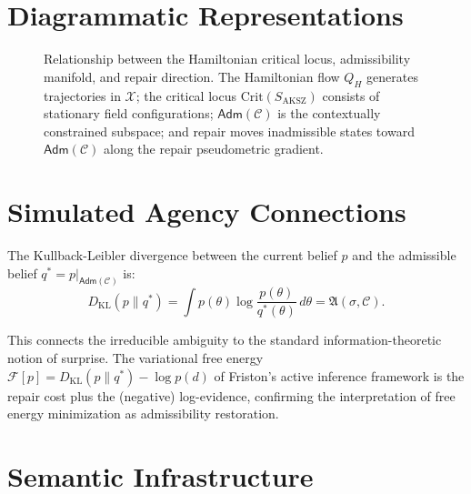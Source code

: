 \documentclass[a4paper,12pt]{article}
\theoremstyle{definition}
\newcommand{\X}{\mathcal{X}}
\newcommand{\Adm}{\mathsf{Adm}}
\newcommand{\Amb}{\mathfrak{A}}
\begin{document}
\section{Diagrammatic Representations}
\label{app:diagrams}

\begin{figure}[h]
\centering
{}
\caption{Relationship between the Hamiltonian critical locus, admissibility manifold, and repair direction. The Hamiltonian flow $Q_H$ generates trajectories in $\X$; the critical locus $\mathrm{Crit}(S_{\mathrm{AKSZ}})$ consists of stationary field configurations; $\Adm(\mathcal{C})$ is the contextually constrained subspace; and repair moves inadmissible states toward $\Adm(\mathcal{C})$ along the repair pseudometric gradient.}
\label{fig:hamiltonian_adm}
\end{figure}

\section{Simulated Agency Connections}
\label{app:agency}

The Kullback-Leibler divergence between the current belief $p$ and the admissible belief $q^* = p|_{\Adm(\mathcal{C})}$ is:
\[
D_{\mathrm{KL}}(p \| q^*) = \int p(\theta) \log \frac{p(\theta)}{q^*(\theta)} \, d\theta = \Amb(\sigma, \mathcal{C}).
\]

This connects the irreducible ambiguity to the standard information-theoretic notion of surprise. The variational free energy $\mathcal{F}[p] = D_{\mathrm{KL}}(p \| q^*) - \log p(d)$ of Friston's active inference framework \cite{Friston2010} is the repair cost plus the (negative) log-evidence, confirming the interpretation of free energy minimization as admissibility restoration.

\section{Semantic Infrastructure}
\label{app:semantic}
\end{document}
